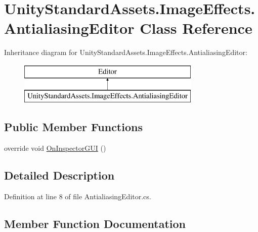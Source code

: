 \hypertarget{class_unity_standard_assets_1_1_image_effects_1_1_antialiasing_editor}{}\section{Unity\+Standard\+Assets.\+Image\+Effects.\+Antialiasing\+Editor Class Reference}
\label{class_unity_standard_assets_1_1_image_effects_1_1_antialiasing_editor}
Inheritance diagram for Unity\+Standard\+Assets.\+Image\+Effects.\+Antialiasing\+Editor\+:\begin{figure}[H]
\begin{center}
\leavevmode
\includegraphics[height=2.000000cm]{class_unity_standard_assets_1_1_image_effects_1_1_antialiasing_editor}
\end{center}
\end{figure}
\subsection*{Public Member Functions}
\begin{DoxyCompactItemize}
\item 
override void \mbox{\hyperlink{class_unity_standard_assets_1_1_image_effects_1_1_antialiasing_editor_a28377148aa4bc1741c3dfd3c3aca259f}{On\+Inspector\+G\+UI}} ()
\end{DoxyCompactItemize}


\subsection{Detailed Description}


Definition at line 8 of file Antialiasing\+Editor.\+cs.



\subsection{Member Function Documentation}
\mbox{\label{class_unity_standard_assets_1_1_image_effects_1_1_antialiasing_editor_a28377148aa4bc1741c3dfd3c3aca259f}} 
